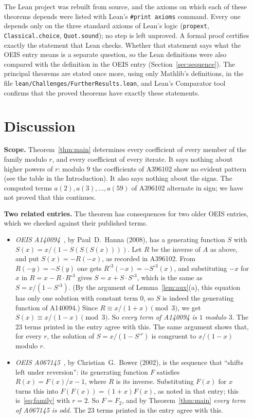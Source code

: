 \documentclass[11pt,a4paper]{article}
\theoremstyle{definition}
\theoremstyle{remark}
\newcommand{\para}[1]{\par\medskip\noindent\textbf{#1}\enspace}
\begin{document}
The Lean project was rebuilt from source, and the axioms on which each of these theorems depends were listed with
Lean's \texttt{\#print axioms} command. Every one depends only on the three standard axioms of Lean's logic
(\texttt{propext}, \texttt{Classical.choice}, \texttt{Quot.sound}); no step is left unproved. A formal proof certifies
exactly the statement that Lean checks. Whether that statement says what the OEIS entry means is a separate question,
so the Lean definitions were also compared with the definition in the OEIS entry
(Section~\ref{sec:sequence}). The principal theorems are stated once more, using only Mathlib's definitions, in the
file \texttt{lean/Challenges/FurtherResults.lean}, and Lean's Comparator tool confirms that the
proved theorems have exactly these statements.

\section{Discussion}\label{sec:discussion}

\para{Scope.} Theorem~\ref{thm:main} determines every coefficient of every member of the family modulo $r$, and every
coefficient of every iterate. It says nothing about higher powers of $r$: modulo $9$ the coefficients of A396102 show no
evident pattern (see the table in the Introduction). It also says nothing about the signs. The computed
terms $a(2),a(3),\dots,a(59)$ of A396102 alternate in sign; we have not proved that this continues.

\para{Two related entries.} The theorem has consequences for two older OEIS entries, which we checked against their
published terms.
\begin{itemize}
\item \emph{OEIS A140094}~\cite{oeisR}, by Paul~D.~Hanna (2008), has a generating function $S$ with
$S(x)=x/(1-S(S(S(x))))$. Let $R$ be the inverse of $A$ as above, and put $S(x)=-R(-x)$, as recorded in A396102. From
$R(-y)=-S(y)$ one gets $R^{\circ 3}(-x)=-S^{\circ3}(x)$, and substituting $-x$ for $x$ in $R=x-R\cdot R^{\circ3}$ gives
$S=x+S\cdot S^{\circ3}$, which is the same as $S=x/(1-S^{\circ3})$. (By the argument of Lemma~\ref{lem:aux}(a), this
equation has only one solution with constant term $0$, so $S$ is indeed the generating function of A140094.) Since $R\equiv x/(1+x)\pmod3$, we get
$S(x)\equiv x/(1-x)\pmod3$. So \emph{every term of A140094 is $1$ modulo $3$.} The 23 terms printed in the entry
agree with this. The same argument shows that, for every $r$, the solution of $S=x/(1-S^{\circ r})$ is congruent to
$x/(1-x)$ modulo $r$.
\item \emph{OEIS A067145}~\cite{oeisF2}, by Christian~G.~Bower (2002), is the sequence that ``shifts left under
reversion'': its generating function $F$ satisfies $R(x)=F(x)/x-1$, where $R$ is its inverse. Substituting $F(x)$ for
$x$ turns this into $F(F(x))=(1+x)F(x)$, as noted in that entry; this is~\eqref{eq:family} with $r=2$. So $F=F_2$,
and by Theorem~\ref{thm:main} \emph{every term of A067145 is odd.} The 23 terms printed in the entry agree with this.
\end{itemize}
\end{document}
